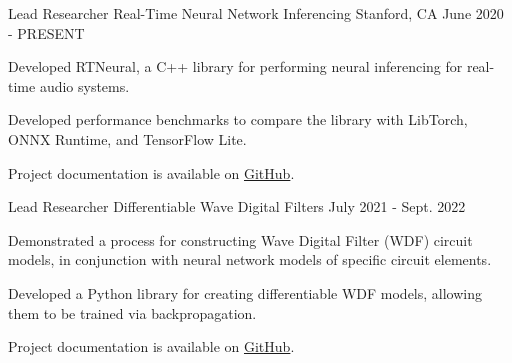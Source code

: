 
\begin{cventries}

  \cventry
    {Lead Researcher} %
    {Real-Time Neural Network Inferencing} %
    {Stanford, CA} %
    {June 2020 - PRESENT} %
    {
      \begin{cvitems} %
        \item {Developed RTNeural, a C++ library for performing neural inferencing for real-time audio systems.}
        \item {Developed performance benchmarks to compare the library with LibTorch, ONNX Runtime, and TensorFlow Lite.}
        \item {Project documentation is available on \href{https://github.com/jatinchowdhury18/RTNeural}{GitHub}.}
      \end{cvitems}
    }

  \cventry
    {Lead Researcher} %
    {Differentiable Wave Digital Filters} %
    {} %
    {July 2021 - Sept. 2022} %
    {
      \begin{cvitems} %
        \item {Demonstrated a process for constructing Wave Digital Filter (WDF) circuit models, in conjunction with neural network models of specific circuit elements.}
        \item {Developed a Python library for creating differentiable WDF models, allowing them to be trained via backpropagation.}
        \item {Project documentation is available on \href{https://github.com/jatinchowdhury18/differentiable-wdfs}{GitHub}.}
      \end{cvitems}
    }


\end{cventries}
